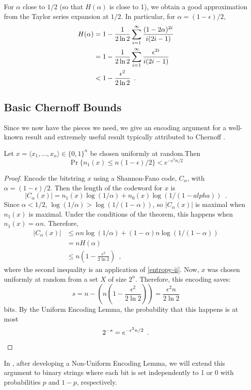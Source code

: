 \documentclass{patmorin}
\begin{document}
For $\alpha$ close to $1/2$ (so that $H(\alpha)$ is close to 1), we
obtain a good approximation from the Taylor series expansion at $1/2$. In
particular, for $\alpha=(1-\epsilon)/2$,
\begin{align}
   H(\alpha) & = 1-\frac{1}{2\ln 2}\sum_{i=1}^{\infty}\frac{(1-2\alpha)^{2i}}{i(2i-1)} 
            \notag \\ 
        & = 1-\frac{1}{2\ln 2}\sum_{i=1}^{\infty}\frac{\epsilon^{2i}}{i(2i-1)} 
             \notag \\ 
        & < 1-\frac{\epsilon^2}{2\ln 2} \enspace .\eqlabel{entropy-ii}
\end{align}

\subsection{Basic Chernoff Bounds}

Since we now have the pieces we need, we give an encoding argument for a well-known result and extremely useful result typically attributed to Chernoff \cite{X}.  

\begin{thm}\label{chernoff-basic}
Let $x=\langle x_1,\ldots,x_n\rangle\in\{0,1\}^n$ be chosen uniformly at random.Then
\[  \Pr\{n_1(x) \le n(1-\epsilon)/2\} < e^{-\epsilon^2n/2} \]
\end{thm}

\begin{proof}
Encode the bitstring $x$ using a Shannon-Fano code, $C_\alpha$, with $\alpha=(1-\epsilon)/2$.  Then the length of the codeword for $x$ is 
\[
     |C_\alpha(x)| = n_1(x)\log(1/\alpha) + n_0(x)\log (1/(1-alpha))  \enspace .
\]
Since $\alpha < 1/2$, $\log(1/\alpha) > \log(1/(1-\alpha))$, so $|C_\alpha(x)|$ is maximal when $n_1(x)$ is maximal.  Under the conditions of the theorem, this happens when $n_1(x)=\alpha n$.  Therefore,
\begin{align*}
  |C_\alpha(x)| & \le \alpha n\log(1/\alpha) + (1-\alpha)n\log(1/(1-\alpha))\\
                & = n H(\alpha) \\
                & \le n\left(1-\frac{\epsilon^2}{2\ln 2}\right) \enspace ,
\end{align*}
where the second inequality is an application of \eqref{entropy-ii}.
Now, $x$ was chosen uniformly at random from a set $X$ of size $2^n$.  Therefore, this encoding saves:
\[  
    s = n-\left(n\left(1-\frac{\epsilon^2}{2\ln 2}\right)\right)
      = \frac{\epsilon^2n}{2\ln 2} \]
bits.  By the Uniform Encoding Lemma, the probability that this happens is at
most
\[
     2^{-s} = e^{-\epsilon^2n/2} \enspace . \qedhere
\]
\end{proof}
In , after developing a Non-Uniform Encoding Lemma,
we will extend this argument to binary strings where each bit is set
independently to 1 or 0 with probabilities $p$ and $1-p$, respectively.
\end{document}
